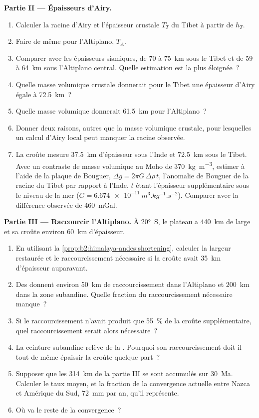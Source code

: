 \begin{problem}
\noindent\textbf{Partie II --- Épaisseurs d'Airy.}
\begin{enumerate}[resume]
\item Calculer la racine d'Airy et l'épaisseur crustale $T_T$ du Tibet à partir de $h_T$.
\item Faire de même pour l'Altiplano, $T_A$.
\item Comparer avec les épaisseurs sismiques, de 70 à \qty{75}{km} sous le Tibet et de
59 à \qty{64}{km} sous l'Altiplano central. Quelle estimation est la plus éloignée~?
\item Quelle masse volumique crustale donnerait pour le Tibet une épaisseur d'Airy égale à \qty{72.5}{km}~?
\item Quelle masse volumique donnerait \qty{61.5}{km} pour l'Altiplano~?
\item Donner deux raisons, autres que la masse volumique crustale, pour
lesquelles un calcul d'Airy local peut manquer la racine observée.
\item La croûte mesure \qty{37.5}{km} d'épaisseur sous l'Inde et \qty{72.5}{km} sous le Tibet. Avec un contraste
de masse volumique au Moho de \qty{370}{kg.m^{-3}}, estimer à l'aide de la plaque de Bouguer, $\Delta g
= 2\pi G\,\Delta\rho\,t$, l'anomalie de Bouguer de la racine du Tibet par rapport à
l'Inde, $t$ étant l'épaisseur supplémentaire sous le niveau de la mer
($G = \qty{6.674e-11}{m^3.kg^{-1}.s^{-2}}$). Comparer avec la différence observée de \qty{460}{mGal}.
\end{enumerate}

\noindent\textbf{Partie III --- Raccourcir l'Altiplano.} À \ang{20}~S, le
plateau a \qty{440}{km} de large et sa croûte environ \qty{60}{km} d'épaisseur.
\begin{enumerate}[resume]
\item En utilisant la \cref{prop:b2:himalaya-andes:shortening}, calculer la largeur restaurée
et le raccourcissement nécessaire si la croûte avait \qty{35}{km} d'épaisseur auparavant.
\item Des  donnent environ \qty{50}{km} de raccourcissement dans l'Altiplano
et \qty{200}{km} dans la zone subandine. Quelle fraction du raccourcissement nécessaire manque~?
\item Si le raccourcissement n'avait produit que \qty{55}{\percent} de la
croûte supplémentaire, quel raccourcissement serait alors nécessaire~?
\item La ceinture subandine relève de la . Pourquoi
son raccourcissement doit-il tout de même épaissir la croûte quelque part~?
\item Supposer que les \qty{314}{km} de la partie III se sont accumulés sur
\qty{30}{Ma}. Calculer le taux moyen, et la fraction de la convergence
actuelle entre Nazca et Amérique du Sud, \qty{72}{mm} par an, qu'il représente.
\item Où va le reste de la convergence~?
\end{enumerate}


\end{problem}
